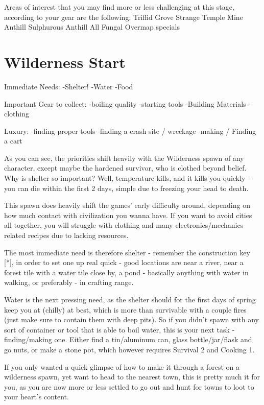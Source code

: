 \documentclass[11pt]{report}
\begin{document}
Areas of interest that you may find more or less challenging at this stage, according to your gear are the following:
Triffid Grove
Strange Temple
Mine
Anthill
Sulphurous Anthill
All Fungal Overmap specials

\section{Wilderness Start}

Immediate Needs:
	-Shelter!
	-Water
	-Food

Important Gear to collect:
	-boiling quality
	-starting tools
	-Building Materials
	-clothing

Luxury:
	-finding proper tools
	-finding a crash site / wreckage
	-making / Finding a cart

As you can see, the priorities shift heavily with the Wilderness spawn of any character, except maybe the hardened survivor, who is clothed beyond belief. Why is shelter so important? Well, temperature kills, and it kills you quickly - you can die within the first 2 days, simple due to freezing your head to death.

This spawn does heavily shift the games' early difficulty around, depending on how much contact with civilization you wanna have. If you want to avoid cities all together, you will struggle with clothing and many electronics/mechanics related recipes due to lacking resources.

The most immediate need is therefore shelter - remember the construction key [*], in order to set one up real quick - good locations are near a river, near a forest tile with a water tile close by, a pond - basically anything with water in walking, or preferably - in crafting range.


Water is the next pressing need, as the shelter should for the first days of spring keep you at (chilly) at best, which is more than survivable with a couple fires (just make sure to contain them with deep pits). So if you didn't spawn with any sort of container or tool that is able to boil water, this is your next task - finding/making one. Either find a tin/aluminum can, glass bottle/jar/flask and go nuts, or make a stone pot, which however requires Survival 2 and Cooking 1.

If you only wanted a quick glimpse of how to make it through a forest on a wilderness spawn, yet want to head to the nearest town, this is pretty much it for you, as you are now more or less settled to go out and hunt for towns to loot to your heart's content.
\end{document}
